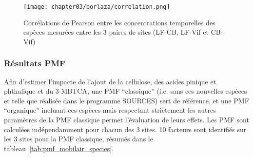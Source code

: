 \begin{figure}[ht]
    \centering
    \texttt{[image: chapter03/borlaza/correlation.png]}
    \caption{Corrélations de Pearson entre les concentrations temporelles des espèces
        mesurées entre les 3 paires de sites (LF-CB, LF-Vif et CB-Vif)}%
    \label{fig:chapter03/borlaza/correlation}
\end{figure}

\subsubsection{Résultats PMF}%
\label{ssub:résultats_pmf}

Afin d'estimer l'impacte de l'ajout de la cellulose, des acides pinique et phthalique et
du 3-MBTCA, une PMF ``classique'' (i.e. sans ces nouvelles espèces et telle que
réalisée dans le programme SOURCES) sert de référence, et une PMF ``organique'' incluant
ces espèces mais respectant strictement les autres paramètres de la PMF classique permet
l'évaluation de leurs effets.  Les PMF sont calculées indépendamment pour chacun des 3
sites.  10 facteurs sont identifiés sur les 3 sites pour la PMF classique, résumés dans
le tableau~\ref{tab:pmf_mobilair_species}.

